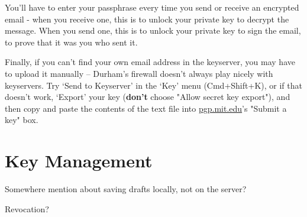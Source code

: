 \begin{compactenum}[1.]
  \item You'll have to enter your passphrase every time you send or receive an encrypted email - when you receive one, this is to unlock your private key to decrypt the message. When you send one, this is to unlock your private key to sign the email, to prove that it was you who sent it.
    \item Finally, if you can't find your own email address in the keyserver, you may have to upload it manually -- Durham's firewall doesn't always play nicely with keyservers. Try `Send to Keyserver' in the `Key' menu (Cmd+Shift+K), or if that doesn't work, `Export' your key (\textbf{don't} choose "Allow secret key export"), and then copy and paste the contents of the text file into \href{http://pgp.mit.edu}{pgp.mit.edu}'s "Submit a key" box.
\end{compactenum}%

\section{Key Management}

Somewhere mention about saving drafts locally, not on the server?

Revocation?














\loggingall

\endinput
